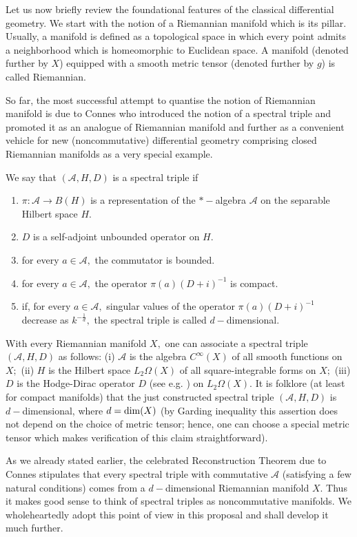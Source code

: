 \documentclass{article}
\begin{document}
Let us now briefly review the foundational features of the classical differential geometry. We start with the notion of a Riemannian manifold which is its pillar. Usually, a manifold is defined as a topological space in which every point admits a neighborhood which is homeomorphic to Euclidean space. A manifold (denoted further by $X$) equipped with a smooth metric tensor (denoted further by $g$) is called Riemannian.

So far, the most successful attempt to quantise the notion of Riemannian manifold is due to Connes who introduced the notion of a spectral triple and promoted it as an analogue of Riemannian manifold and further as a convenient vehicle for new (noncommutative) differential geometry comprising closed Riemannian manifolds as a very special example.  

We say that $(\mathcal{A},H,D)$ is a spectral triple if
\begin{enumerate}
\item $\pi:\mathcal{A}\to B(H)$ is a representation of the $\ast-$algebra $\mathcal{A}$ on the separable Hilbert space $H.$
\item $D$ is a self-adjoint unbounded operator on $H.$
\item for every $a\in\mathcal{A},$ the commutator is bounded.
\item for every $a\in\mathcal{A},$ the operator $\pi(a)(D+i)^{-1}$ is compact.
\item if, for every $a\in\mathcal{A},$ singular values of the operator $\pi(a)(D+i)^{-1}$ decrease as $k^{-\frac1d},$ the spectral triple is called $d-$dimensional.
\end{enumerate}

With every Riemannian manifold $X,$ one can associate a spectral triple $(\mathcal{A},H,D)$ as follows: (i) $\mathcal{A}$ is the algebra $C^{\infty}(X)$ of all smooth functions on $X;$ (ii) $H$ is the Hilbert space $L_2\Omega(X)$ of all square-integrable forms on $X;$ (iii) $D$ is the Hodge-Dirac operator $D$ (see e.g. \cite{BGV}) on $L_2\Omega(X).$ It is folklore (at least for compact manifolds) that the just constructed spectral triple $(\mathcal{A},H,D)$ is $d-$dimensional, where $d={\rm dim}(X)$ (by Garding inequality \cite{Rosenberg} this assertion does not depend on the choice of metric tensor; hence, one can choose a special metric tensor which makes verification of this claim straightforward).

As we already stated earlier, the celebrated Reconstruction Theorem due to Connes \cite{Connes-reconstruction} stipulates that every spectral triple with commutative $\mathcal{A}$ (satisfying a few natural conditions) comes from a $d-$dimensional Riemannian manifold $X.$ Thus it makes good sense to think of spectral triples as noncommutative manifolds. We wholeheartedly adopt this point of view in this proposal and shall develop it much further.
\end{document}
